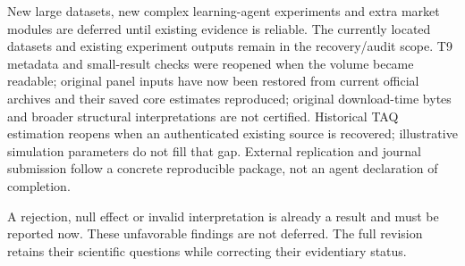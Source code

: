 New large datasets, new complex learning-agent experiments and extra market modules are deferred until existing evidence is reliable. The currently located datasets and existing experiment outputs remain in the recovery/audit scope. T9 metadata and small-result checks were reopened when the volume became readable; original panel inputs have now been restored from current official archives and their saved core estimates reproduced; original download-time bytes and broader structural interpretations are not certified. Historical TAQ estimation reopens when an authenticated existing source is recovered; illustrative simulation parameters do not fill that gap. External replication and journal submission follow a concrete reproducible package, not an agent declaration of completion.

A rejection, null effect or invalid interpretation is already a result and must be reported now. These unfavorable findings are not deferred. The full revision retains their scientific questions while correcting their evidentiary status.
